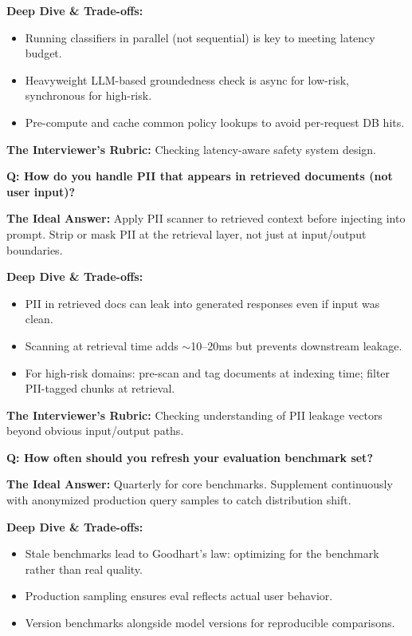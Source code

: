 \textbf{Deep Dive \& Trade-offs:}
\begin{itemize}
  \item Running classifiers in parallel (not sequential) is key to meeting latency budget.
  \item Heavyweight LLM-based groundedness check is async for low-risk, synchronous for high-risk.
  \item Pre-compute and cache common policy lookups to avoid per-request DB hits.
\end{itemize}

\textbf{The Interviewer's Rubric:} Checking latency-aware safety system design.

\textbf{Q: How do you handle PII that appears in retrieved documents (not user input)?}

\textbf{The Ideal Answer:} Apply PII scanner to retrieved context before injecting into prompt. Strip or mask PII at the retrieval layer, not just at input/output boundaries.

\textbf{Deep Dive \& Trade-offs:}
\begin{itemize}
  \item PII in retrieved docs can leak into generated responses even if input was clean.
  \item Scanning at retrieval time adds $\sim$10--20ms but prevents downstream leakage.
  \item For high-risk domains: pre-scan and tag documents at indexing time; filter PII-tagged chunks at retrieval.
\end{itemize}

\textbf{The Interviewer's Rubric:} Checking understanding of PII leakage vectors beyond obvious input/output paths.

\textbf{Q: How often should you refresh your evaluation benchmark set?}

\textbf{The Ideal Answer:} Quarterly for core benchmarks. Supplement continuously with anonymized production query samples to catch distribution shift.

\textbf{Deep Dive \& Trade-offs:}
\begin{itemize}
  \item Stale benchmarks lead to Goodhart's law: optimizing for the benchmark rather than real quality.
  \item Production sampling ensures eval reflects actual user behavior.
  \item Version benchmarks alongside model versions for reproducible comparisons.
\end{itemize}

